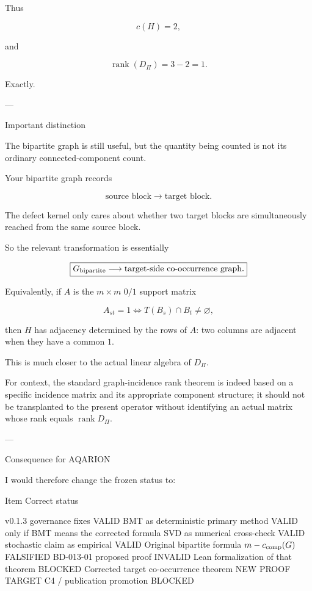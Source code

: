 Thus

\[
c(H)=2,  
\]

and

\[
\operatorname{rank}(D_\Pi)=3-2=1.  
\]

Exactly.


---

Important distinction

The bipartite graph is still useful, but the quantity being counted is not its ordinary connected-component count.

Your bipartite graph records

\[
\text{source block}\longrightarrow\text{target block}.  
\]

The defect kernel only cares about whether two target blocks are simultaneously reached from the same source block.

So the relevant transformation is essentially

\[
\boxed{  
G_{\rm bipartite}  
\longrightarrow  
\text{target-side co-occurrence graph}.  
}  
\]

Equivalently, if \(A\) is the \(m\times m\) \(0/1\) support matrix

\[
A_{st}=1  
\iff  
T(B_s)\cap B_t\neq\varnothing,  
\]

then \(H\) has adjacency determined by the rows of \(A\): two columns are adjacent when they have a common \(1\).

This is much closer to the actual linear algebra of \(D_\Pi\).

For context, the standard graph-incidence rank theorem is indeed based on a specific incidence matrix and its appropriate component structure; it should not be transplanted to the present operator without identifying an actual matrix whose rank equals \(\operatorname{rank}D_\Pi\).


---

Consequence for AQARION

I would therefore change the frozen status to:

Item	Correct status

v0.1.3 governance fixes	VALID
BMT as deterministic primary method	VALID only if BMT means the corrected formula
SVD as numerical cross-check	VALID
stochastic claim as empirical	VALID
Original bipartite formula \(m-c_{\rm comp}(G)\)	FALSIFIED
BD-013-01 proposed proof	INVALID
Lean formalization of that theorem	BLOCKED
Corrected target co-occurrence theorem	NEW PROOF TARGET
C4 / publication promotion	BLOCKED

